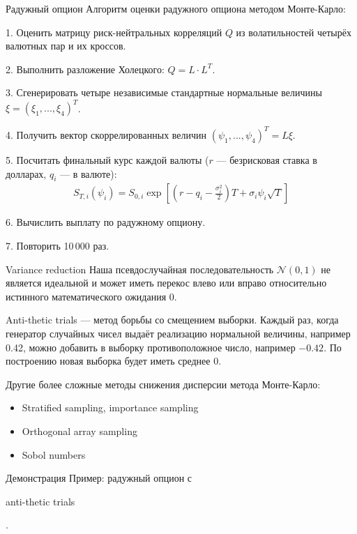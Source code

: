 \documentclass{beamer}
\newcommand{\en}[1]{\begin{otherlanguage}{english}#1\end{otherlanguage}}
\begin{document}
\begin{frame}{Радужный опцион}
\justify
Алгоритм оценки радужного опциона методом Монте-Карло:

1. Оценить матрицу риск-нейтральных корреляций $Q$ из волатильностей четырёх валютных пар и их кроссов.

2. Выполнить разложение Холецкого: $Q = L \cdot L^T$.

3. Сгенерировать четыре независимые стандартные нормальные величины $\xi = (\xi_1,...,\xi_4)^T$.

4. Получить вектор скоррелированных величин $(\psi_1,...,\psi_4)^T = L\xi$.

5. Посчитать финальный курс каждой валюты ($r$ --- безрисковая ставка в долларах, $q_i$ --- в валюте):
\begin{align*}
S_{T,i}(\psi_i) = S_{0,i}\exp\left[\left(r - q_i - \frac{\sigma_i^2}{2}\right)T + \sigma_i\psi_i\sqrt{T}\right]
\end{align*}

6. Вычислить выплату по радужному опциону.

7. Повторить 10\,000 раз.
\end{frame}



\begin{frame}{Variance reduction}
\justify
Наша псевдослучайная последовательность $\mathcal{N}(0,1)$ не является идеальной и может иметь перекос влево или вправо относительно истинного математического ожидания 0.

\justify
\alert{Anti-thetic trials} --- метод борьбы со смещением выборки. Каждый раз, когда генератор случайных чисел выдаёт реализацию нормальной величины, например 0.42, можно добавить в выборку противоположное число, например $-0.42$. По построению новая выборка будет иметь среднее 0.

\justify
Другие более сложные методы снижения дисперсии метода Монте-Карло:
\begin{itemize}
\item Stratified sampling, importance sampling
\item Orthogonal array sampling
\item Sobol numbers
\end{itemize}
\end{frame}



\begin{frame}{Демонстрация}
\justify
Пример: радужный опцион с \en{anti-thetic trials}.
\end{frame}
\end{document}
